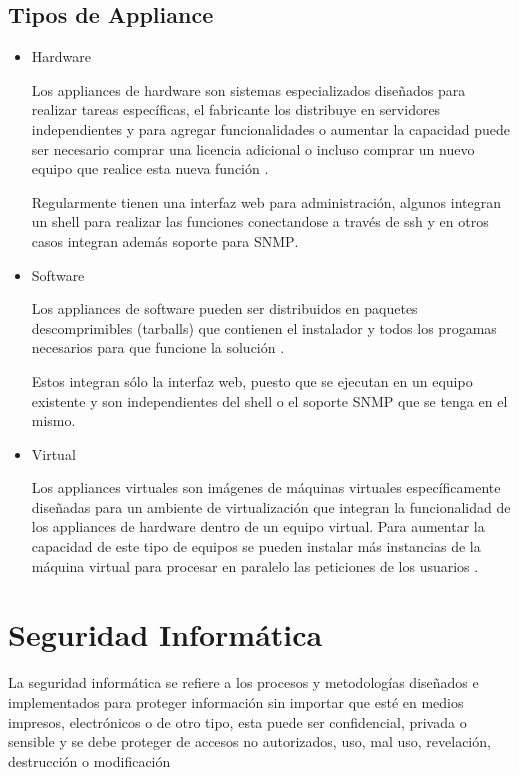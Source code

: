     \subsection{Tipos de Appliance}

\begin{itemize}

  \item Hardware

Los appliances de hardware son sistemas especializados dise\~{n}ados para realizar tareas espec\'{i}ficas, el fabricante los distribuye en servidores independientes y para agregar funcionalidades o aumentar la capacidad puede ser necesario comprar una licencia adicional o incluso comprar un nuevo equipo que realice esta nueva funci\'{o}n \cite{}.

Regularmente tienen una interfaz web para administraci\'{o}n, algunos integran un shell para realizar las funciones conectandose a trav\'{e}s de ssh y en otros casos integran adem\'{a}s soporte para \textsc{SNMP}.

  \item Software

Los appliances de software pueden ser distribuidos en paquetes descomprimibles (tarballs) que contienen el instalador y todos los progamas necesarios para que funcione la soluci\'{o}n \cite{_bitnami:_????}.

Estos integran s\'{o}lo la interfaz web, puesto que se ejecutan en un equipo existente y son independientes del shell o el soporte \textsc{SNMP} que se tenga en el mismo.

  \item Virtual

Los appliances virtuales son im\'{a}genes de m\'{a}quinas virtuales espec\'{i}ficamente dise\~{n}adas para un ambiente de virtualizaci\'{o}n que integran la funcionalidad de los appliances de hardware dentro de un equipo virtual. Para aumentar la capacidad de este tipo de equipos se pueden instalar m\'{a}s instancias de la m\'{a}quina virtual para procesar en paralelo las peticiones de los usuarios \cite{_why_????}.

\end{itemize}

\section {Seguridad Inform\'{a}tica}

La seguridad inform\'{a}tica se refiere a los procesos y metodolog\'{i}as dise\~{n}ados e implementados para proteger informaci\'{o}n sin importar que est\'{e} en medios impresos, electr\'{o}nicos o de otro tipo, esta puede ser confidencial, privada o sensible y se debe proteger de accesos no autorizados, uso, mal uso, revelaci\'{o}n, destrucci\'{o}n o modificaci\'{o}n \cite{_sans:_????}


